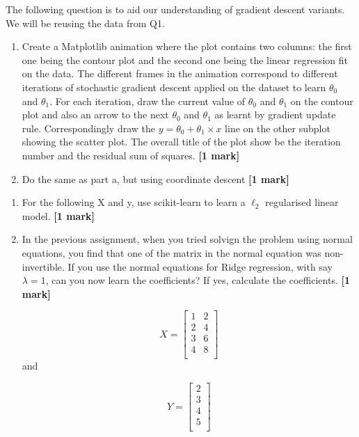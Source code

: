 \documentclass[colorlinks,linkcolor=true]{article}
\begin{document}
\item The following question is to aid our understanding of gradient descent variants. We will be reusing the data from Q1. 
\begin{enumerate}
	\item Create a Matplotlib animation where the plot contains two columns: the first one being the contour plot and the second one being the linear regression fit on the data. The different frames in the animation correspond to different iterations of stochastic gradient descent applied on the dataset to learn $\theta_0$ and $\theta_1$. For each iteration, draw the current value of $\theta_0$ and $\theta_1$ on the contour plot and also an arrow to the next $\theta_0$ and $\theta_1$ as learnt by gradient update rule. Correspondingly draw the $y = \theta_0 + \theta_1\times x$ line on the other subplot showing the scatter plot. The overall title of the plot show be the iteration number and the residual sum of squares. \textbf{[1 mark]}
		\item Do the same as part a, but using coordinate descent \textbf{[1 mark]}
\end{enumerate}



	\item 	
	\begin{enumerate}
		\item For the following X and y, use scikit-learn to learn a $\ell_2$ regularised linear model. \textbf{[1 mark]}
		\item In the previous assignment, when you tried solvign the problem using normal equations, you find that one of the matrix in the normal equation was non-invertible. If you use the normal equations for Ridge regression, with say $\lambda=1$, can you now learn the coefficients? If yes, calculate the coefficients.  \textbf{[1 mark]}

	
$$X = \begin{bmatrix}


1       & 2 \\
2      &  4  \\
3      &  6  \\
4      &  8  \\

\end{bmatrix}$$
and 

$$Y = \begin{bmatrix}


2 \\
3  \\
4  \\
5  \\

\end{bmatrix}$$

	\end{enumerate}
\end{document}
